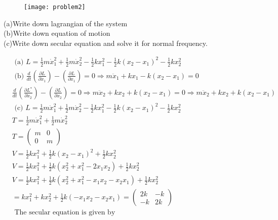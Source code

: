 \begin{enumerate}
\begin{figure}[H]
	\centering
	\texttt{[image: problem2]}
\end{figure}
(a)Write down lagrangian of the system\\
(b)Write down equation of motion\\
(c)Write down secular equation and solve it for normal frequency.
\begin{answer}
	\begin{align*}
	&\text { (a) } L=\frac{1}{2} m \dot{x}_{1}^{2}+\frac{1}{2} m \dot{x}_{2}^{2}-\frac{1}{2} k x_{1}^{2}-\frac{1}{2} k\left(x_{2}-x_{1}\right)^{2}-\frac{1}{2} k x_{2}^{2}\\
	&\text { (b) } \frac{d}{d t}\left(\frac{\partial L}{\partial \dot{x}_{1}}\right)-\left(\frac{\partial L}{\partial x_{1}}\right)=0 \Rightarrow m \ddot{x}_{1}+k x_{1}-k\left(x_{2}-x_{1}\right)=0\\
	&\frac{d}{d t}\left(\frac{\partial L^{*}}{\partial \dot{x}_{2}}\right)-\left(\frac{\partial L}{\partial x_{2}}\right)=0 \Rightarrow m \ddot{x}_{2}+k x_{2}+k\left(x_{2}-x_{1}\right)=0 \Rightarrow m \ddot{x}_{2}+k x_{2}+k\left(x_{2}-x_{1}\right)\\
	&\text { (c) } L=\frac{1}{2} m \dot{x}_{1}^{2}+\frac{1}{2} m \dot{x}_{2}^{2}-\frac{1}{2} k x_{1}^{2}-\frac{1}{2} k\left(x_{2}-x_{1}\right)^{2}-\frac{1}{2} k x_{2}^{2}\\
	&T=\frac{1}{2} m \dot{x}_{1}^{2}+\frac{1}{2} m \dot{x}_{2}^{2}\\
	&T=\left(\begin{array}{ll}
	m & 0 \\
	0 & m
	\end{array}\right)\\
	&V=\frac{1}{2} k x_{1}^{2}+\frac{1}{2} k\left(x_{2}-x_{1}\right)^{2}+\frac{1}{2} k x_{2}^{2}\\
	&V=\frac{1}{2} k x_{1}^{2}+\frac{1}{2} k\left(x_{2}^{2}+x_{1}^{2}-2 x_{1} x_{2}\right)+\frac{1}{2} k x_{2}^{2}\\
	&V=\frac{1}{2} k x_{1}^{2}+\frac{1}{2} k\left(x_{2}^{2}+x_{1}^{2}-x_{1} x_{2}-x_{2} x_{1}\right)+\frac{1}{2} k x_{2}^{2}\\
	&=k x_{1}^{2}+k x_{2}^{2}+\frac{1}{2} k\left(-x_{1} x_{2}-x_{2} x_{1}\right)=\left(\begin{array}{cc}
	2 k & -k \\
	-k & 2 k
	\end{array}\right)\\
	&\text { The secular equation is given by }\\

\end{align*}
\end{answer}
\end{enumerate}
